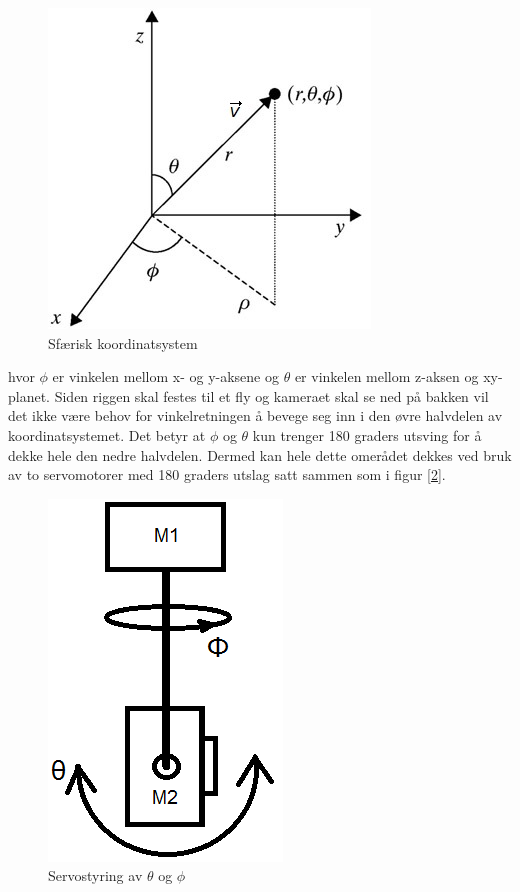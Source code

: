 \begin{figure}[h!]
	\centering
	\includegraphics[scale=0.5]{img/RettVek.jpg}
	\caption{Sfærisk koordinatsystem}
	\label{fig:spher}
\end{figure}

hvor $\phi$ er vinkelen mellom x- og y-aksene og $\theta$ er vinkelen mellom z-aksen og xy-planet. Siden riggen skal festes til et fly og kameraet skal se ned på bakken vil det ikke være behov for vinkelretningen å bevege seg inn i den øvre halvdelen av koordinatsystemet. Det betyr at $\phi$ og $\theta$ kun trenger 180 graders utsving for å dekke hele den nedre halvdelen. Dermed kan hele dette omerådet dekkes ved bruk av to servomotorer med 180 graders utslag satt sammen som i figur [\ref{fig:IdeRigg}]. 

\begin{figure}[h!]
	\centering
	\includegraphics[scale=0.5]{img/BasicRiggIde.png}
	\caption{Servostyring av $\theta$ og $\phi$}
	\label{fig:IdeRigg}
\end{figure}

